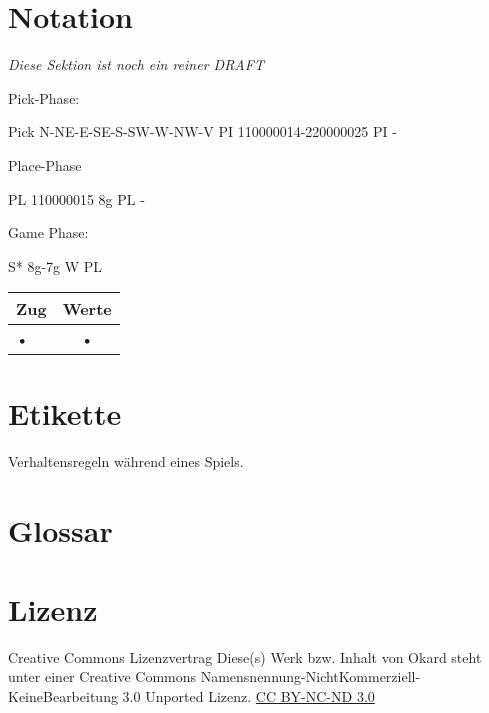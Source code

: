 \documentclass{article}
\begin{document}
\section{Notation}

\textit{Diese Sektion ist noch ein reiner DRAFT}


Pick-Phase:

Pick N-NE-E-SE-S-SW-W-NW-V
PI 110000014-220000025
PI - 

Place-Phase
 
PL 110000015 8g
PL -

Game Phase:

S* 8g-7g
W 
PL

\begin{tabular}{|l|c||}
\hline Zug & Werte \\ \hline
• & • \\  
\end{tabular} 


\section{Etikette}
	Verhaltensregeln während eines Spiels.
	
	

\section{Glossar}

\section{Lizenz}
Creative Commons Lizenzvertrag
Diese(s) Werk bzw. Inhalt von Okard steht unter einer Creative Commons Namensnennung-NichtKommerziell-KeineBearbeitung 3.0 Unported Lizenz.
\href{http://creativecommons.org/licenses/by-nc-nd/3.0/}{CC BY-NC-ND 3.0}
\end{document}

